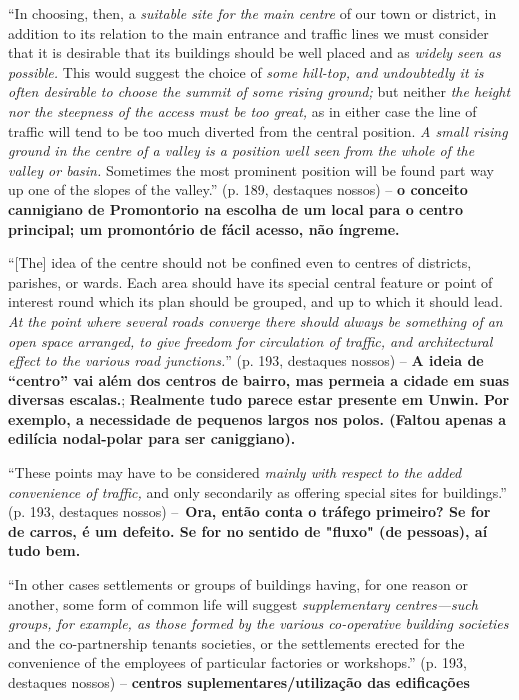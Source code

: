 \documentclass[12pt, a4paper]{book} %
\begin{document}
        ``In choosing, then, a \textit{suitable site for the main centre} of our town or district, in addition to its relation to the main entrance and traffic lines we must consider that it is desirable that its buildings should be well placed and as \textit{widely seen as possible.} This would suggest the choice of \textit{some hill-top, and undoubtedly it is often desirable to choose the summit of some rising ground;} but neither \textit{the height nor the steepness of the access must be too great,} as in either case the line of traffic will tend to be too much diverted from the central position. \textit{A small rising ground in the centre of a valley is a position well seen from the whole of the valley or basin.} Sometimes the most prominent position will be found part way up one of the slopes of the valley.'' (p. 189, destaques nossos) – \textbf{o conceito cannigiano de Promontorio na escolha de um local para o centro principal; um promontório de fácil acesso, não íngreme.}

        ``[The] idea of the centre should not be confined even to centres of districts, parishes, or wards. Each area should have its special central feature or point of interest round which its plan should be grouped, and up to which it should lead. \textit{At the point where several roads converge there should always be something of an open space arranged, to give freedom for circulation of traffic, and architectural effect to the various road junctions.}'' (p. 193, destaques nossos) – \textbf{A ideia de ``centro'' vai além dos centros de bairro, mas permeia a cidade em suas diversas escalas.}; \textbf{Realmente tudo parece estar presente em Unwin. Por exemplo, a necessidade de pequenos largos nos polos. (Faltou apenas a edilícia nodal-polar para ser caniggiano).}

        ``These points may have to be considered \textit{mainly with respect to the added convenience of traffic,} and only secondarily as offering special sites for buildings.'' (p. 193, destaques nossos) – \textbf{Ora, então conta o tráfego primeiro? Se for de carros, é um defeito. Se for no sentido de "fluxo" (de pessoas), aí tudo bem.}

        ``In other cases settlements or groups of buildings having, for one reason or another, some form of common life will suggest \textit{supplementary centres—such groups, for example, as those formed by the various co-operative building societies} and the co-partnership tenants societies, or the settlements erected for the convenience of the employees of particular factories or workshops.'' (p. 193, destaques nossos) – \textbf{centros suplementares/utilização das edificações}
\end{document}
